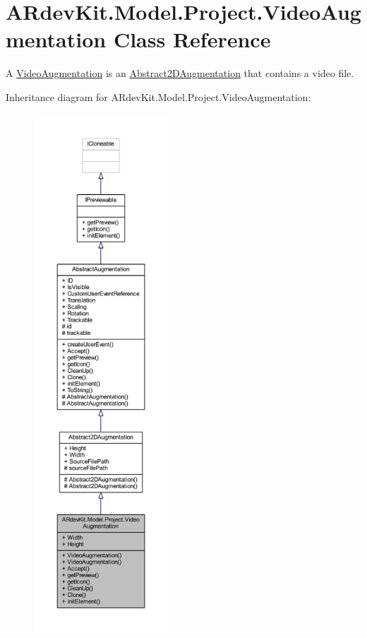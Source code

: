 \hypertarget{class_a_rdev_kit_1_1_model_1_1_project_1_1_video_augmentation}{\section{A\-Rdev\-Kit.\-Model.\-Project.\-Video\-Augmentation Class Reference}
\label{class_a_rdev_kit_1_1_model_1_1_project_1_1_video_augmentation}
}


A \hyperlink{class_a_rdev_kit_1_1_model_1_1_project_1_1_video_augmentation}{Video\-Augmentation} is an \hyperlink{class_a_rdev_kit_1_1_model_1_1_project_1_1_abstract2_d_augmentation}{Abstract2\-D\-Augmentation} that contains a video file.  




Inheritance diagram for A\-Rdev\-Kit.\-Model.\-Project.\-Video\-Augmentation\-:
\nopagebreak
\begin{figure}[H]
\begin{center}
\leavevmode
\includegraphics[height=550pt]{class_a_rdev_kit_1_1_model_1_1_project_1_1_video_augmentation__inherit__graph}
\end{center}
\end{figure}


